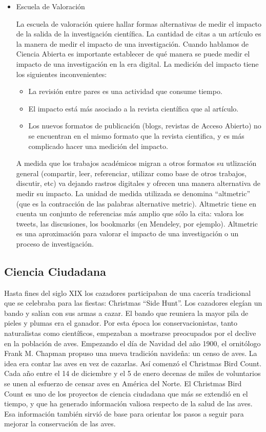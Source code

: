 \begin{itemize}
	\item {Escuela de Valoración} 	
	
	La escuela de valoración quiere hallar formas alternativas de medir el impacto de la salida de la investigación científica. La cantidad de citas a un artículo es la manera de medir el impacto de una investigación. Cuando hablamos de Ciencia Abierta es importante establecer de qué manera se puede medir el impacto de una investigación en la era digital. La medición del impacto tiene los siguientes inconvenientes:
	\begin{itemize}
	\item La revisión entre pares es una actividad que consume tiempo.
	\item El impacto está más asociado a la revista científica que al artículo.
	\item Los nuevos formatos de publicación (blogs, revistas de Acceso Abierto) no se encuentran en el mismo formato que la revista cientifica, y es más complicado hacer una medición del impacto.
	\end{itemize}
	A medida que los trabajos académicos migran a otros formatos su utlización general (compartir, leer, referenciar, utilizar como base de otros trabajos, discutir, etc) va dejando rastros digitales y ofrecen una manera alternativa de medir su impacto. La unidad de medida utilizada se denomina ``altmetric'' (que es la contracción de las palabras alternative metric). Altmetric tiene en cuenta un conjunto de referencias más amplio que sólo la cita: valora los tweets, las discusiones, los bookmarks (en Mendeley, por ejemplo). Altmetric es una aproximación para valorar el impacto de una investigación o un proceso de investigación. 	
	
\end{itemize}	
	
\subsection{Ciencia Ciudadana}

	Hasta fines del siglo XIX los cazadores participaban de una cacería tradicional que se celebraba para las fiestas: Christmas ``Side Hunt''. Los cazadores elegían un bando y salían con sus armas a cazar. El bando que reuniera la mayor pila de pieles y plumas era el ganador. Por esta época los conservacionistas, tanto naturalistas como científicos, empezaban a mostrarse preocupados por el declive en la población de aves. Empezando el día de Navidad del año 1900, el ornitólogo Frank M. Chapman propuso una nueva tradición navideña: un censo de aves. La idea era contar las  aves en vez de cazarlas. Así comenzó el Christmas Bird Count. Cada año entre el 14 de diciembre y el 5 de enero decenas de miles de voluntarios se unen al esfuerzo de censar aves en América del Norte. El Christmas Bird Count es uno de los proyectos de ciencia ciudadana que más se extendió en el tiempo, y que ha generado información valiosa respecto de la salud de las aves. Esa información también sirvió de base para orientar los pasos a seguir para mejorar la conservación de las aves. \cite{CBC}
	
